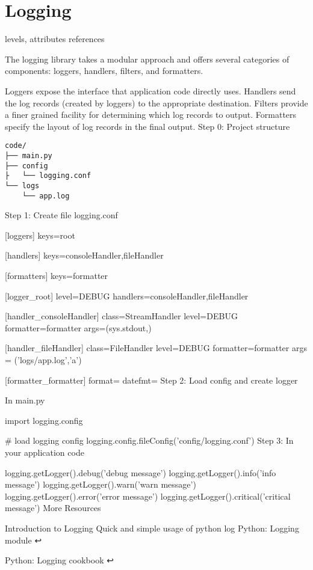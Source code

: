 \section{Logging}

levels, attributes references

The logging library takes a modular approach and offers several categories of components: loggers, handlers, filters, and formatters.

Loggers expose the interface that application code directly uses.
Handlers send the log records (created by loggers) to the appropriate destination.
Filters provide a finer grained facility for determining which log records to output.
Formatters specify the layout of log records in the final output.
Step 0: Project structure

\begin{lstlisting}
code/
├── main.py
├── config
├   └── logging.conf
└── logs
    └── app.log
\end{lstlisting}

Step 1: Create file logging.conf

[loggers]
keys=root

[handlers]
keys=consoleHandler,fileHandler

[formatters]
keys=formatter

[logger_root]
level=DEBUG
handlers=consoleHandler,fileHandler

[handler_consoleHandler]
class=StreamHandler
level=DEBUG
formatter=formatter
args=(sys.stdout,)

[handler_fileHandler]
class=FileHandler
level=DEBUG
formatter=formatter
args = ('logs/app.log','a')

[formatter_formatter]
format=%
datefmt=
Step 2: Load config and create logger

In main.py

import logging.config

# load logging config
logging.config.fileConfig('config/logging.conf')
Step 3: In your application code

logging.getLogger().debug('debug message')
logging.getLogger().info('info message')
logging.getLogger().warn('warn message')
logging.getLogger().error('error message')
logging.getLogger().critical('critical message')
More Resources

Introduction to Logging
Quick and simple usage of python log
Python: Logging module ↩

Python: Logging cookbook ↩

